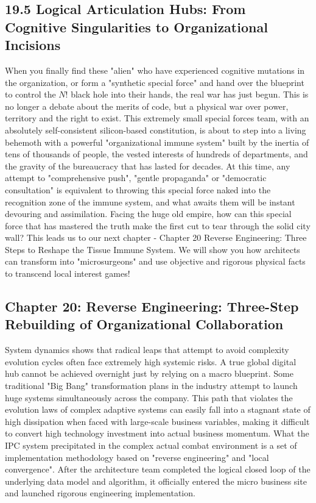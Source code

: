 \documentclass[11pt,a4paper]{article}
\begin{document}
\subsection*{19.5 Logical Articulation Hubs: From Cognitive Singularities to Organizational Incisions}


When you finally find these "alien" who have experienced cognitive mutations in the organization, or form a "synthetic special force" and hand over the blueprint to control the $N!$ black hole into their hands, the real war has just begun. This is no longer a debate about the merits of code, but a physical war over power, territory and the right to exist. This extremely small special forces team, with an absolutely self-consistent silicon-based constitution, is about to step into a living behemoth with a powerful "organizational immune system" built by the inertia of tens of thousands of people, the vested interests of hundreds of departments, and the gravity of the bureaucracy that has lasted for decades. At this time, any attempt to "comprehensive push", "gentle propaganda" or "democratic consultation" is equivalent to throwing this special force naked into the recognition zone of the immune system, and what awaits them will be instant devouring and assimilation. Facing the huge old empire, how can this special force that has mastered the truth make the first cut to tear through the solid city wall? This leads us to our next chapter - Chapter 20 Reverse Engineering: Three Steps to Reshape the Tissue Immune System. We will show you how architects can transform into "microsurgeons" and use objective and rigorous physical facts to transcend local interest games!

\subsection*{Chapter 20: Reverse Engineering: Three-Step Rebuilding of Organizational Collaboration}
System dynamics shows that radical leaps that attempt to avoid complexity evolution cycles often face extremely high systemic risks. A true global digital hub cannot be achieved overnight just by relying on a macro blueprint. Some traditional "Big Bang" transformation plans in the industry attempt to launch huge systems simultaneously across the company. This path that violates the evolution laws of complex adaptive systems can easily fall into a stagnant state of high dissipation when faced with large-scale business variables, making it difficult to convert high technology investment into actual business momentum. What the IPC system precipitated in the complex actual combat environment is a set of implementation methodology based on "reverse engineering" and "local convergence". After the architecture team completed the logical closed loop of the underlying data model and algorithm, it officially entered the micro business site and launched rigorous engineering implementation.
\end{document}
